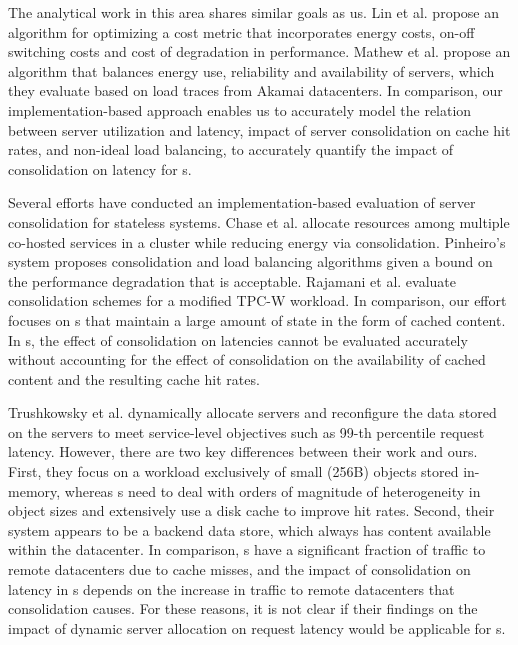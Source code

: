 The analytical work in this area shares similar goals as us.  Lin et al. \cite{lin12} propose an algorithm for optimizing a cost metric that incorporates energy costs, on-off switching costs and cost of degradation in performance. Mathew et al. \cite{mathew12} propose an algorithm that balances energy use, reliability and availability of servers, which they evaluate based on load traces from Akamai datacenters. In comparison, our implementation-based approach enables us to accurately model the relation between server utilization and latency, impact of server consolidation on cache hit rates, and non-ideal load balancing, to accurately quantify the impact of consolidation on latency for \cdc s.

Several efforts have conducted an implementation-based evaluation of server consolidation for stateless systems. Chase et al. \cite{chase2001managing} allocate resources among multiple co-hosted services in a cluster while reducing energy via consolidation. Pinheiro's \cite{pinheiro2001load} system proposes consolidation and load balancing algorithms given a bound on the performance degradation that is acceptable.  Rajamani et al. \cite{rajamani2003evaluating} evaluate consolidation schemes for a modified TPC-W workload. In comparison, our effort focuses on \cdc s that maintain a large amount of state in the form of cached content. In \cdc s, the effect of consolidation on latencies cannot be evaluated accurately without accounting for the effect of consolidation on the availability of cached content and the resulting cache hit rates.

Trushkowsky et al. \cite{Trushkowsky:2011}  dynamically allocate servers and reconfigure the data stored on the servers to meet service-level objectives such as 99-th percentile request latency.  However, there are two key differences between their work and ours. First, they focus  on a workload exclusively of small (256B) objects stored in-memory, whereas  \cdc s need to deal with orders of magnitude of heterogeneity in object sizes and extensively use a disk cache to improve hit rates.  Second, their system appears to be a backend data store, which always has content available within the datacenter. In comparison, \cdc s have a significant fraction of traffic to remote datacenters due to cache misses, and the impact of consolidation on latency in \cdc s depends on the increase in traffic to remote datacenters that consolidation causes. For these reasons, it is not clear if their findings on the impact of dynamic server allocation on request latency would be applicable for \cdc s.

